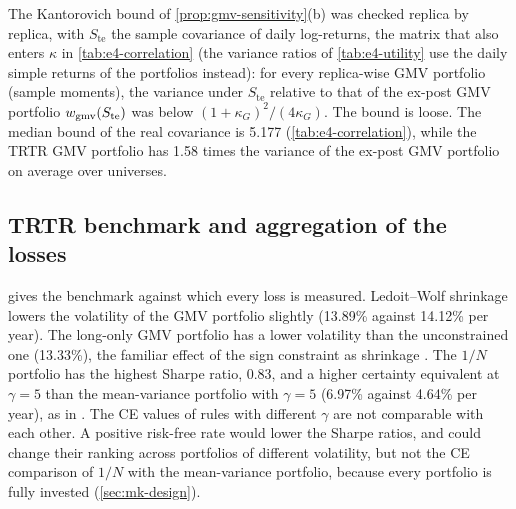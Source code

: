 The Kantorovich bound of \cref{prop:gmv-sensitivity}(b) was checked replica by replica, with
$S_{\mathrm{te}}$ the \TEST{} sample covariance of daily log-returns, the matrix that also enters
$\kappa$ in \cref{tab:e4-correlation} (the variance ratios of \cref{tab:e4-utility} use the daily
simple returns of the portfolios instead): for every replica-wise GMV portfolio (sample moments),
the variance under $S_{\mathrm{te}}$ relative to that of the ex-post GMV portfolio
$w_{\mathrm{gmv}}(S_{\mathrm{te}})$ was below $(1+\kappa_G)^2/(4\kappa_G)$. The bound is loose. The median
bound of the real \TRAIN{} covariance is 5.177 (\cref{tab:e4-correlation}), while the TRTR GMV
portfolio has 1.58 times the variance of the ex-post GMV portfolio on average over universes.

\subsection{TRTR benchmark and aggregation of the losses}\label{app:mk-aggregation}

\begin{table}[tbp]
  \centering
  \caption{Out-of-sample performance of the portfolios trained on real \TRAIN{} (TRTR) on the 615
  \TEST{} days (E4). Means over the 30 universes. Vol.: annualised standard deviation of daily
  simple portfolio returns; Sharpe: annualised Sharpe ratio with a zero risk-free rate; CE:
  certainty-equivalent return with the $\gamma$ of the rule ($\gamma=5$ for GMV and $1/N$),
  percent per year. Sample: sample covariance; LW: Ledoit--Wolf. Point estimates.}
  \label{tab:e4-trtr}
  \small
\end{table}

 gives the benchmark against which every loss is measured. Ledoit--Wolf
shrinkage lowers the volatility of the GMV portfolio slightly (13.89\% against 14.12\% per year).
The long-only GMV portfolio has a lower volatility than the unconstrained one (13.33\%), the
familiar effect of the sign constraint as shrinkage \citep{jagannathan2003risk}. The $1/N$
portfolio has the highest Sharpe ratio, 0.83, and a higher certainty equivalent at $\gamma=5$ than
the mean-variance portfolio with $\gamma=5$ (6.97\% against 4.64\% per year), as in
\citet{demiguel2009optimal}. The CE values of rules with different $\gamma$ are not comparable
with each other. A positive risk-free rate would lower the Sharpe ratios, and could change their
ranking across portfolios of different volatility, but not the CE comparison of $1/N$ with the
mean-variance portfolio, because every portfolio is fully invested (\cref{sec:mk-design}).

